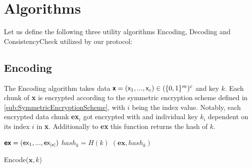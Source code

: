 \documentclass{cacthesis}
\newcounter{protocol}
\begin{document}
        \section{Algorithms}
        \label{sec:ourAlgos}
        Let us define the following three utility algorithms \textsf{Encoding}, \textsf{Decoding} and \textsf{ConsistencyCheck} utilized by our protocol:
        \subsection{Encoding}
        The \textsf{Encoding} algorithm takes data $\textsf{\textbf{x}} = (\textsf{x}_1, ..., \textsf{x}_c) \in (\{0,1\}^m)^c$ and key $k$. Each chunk of \textsf{\textbf{x}} is encrypted according to the symmetric encryption scheme defined in \ref{sub:SymmetricEncryptionScheme}, with $i$ being the index value. Notably, each encrypted data chunk \textsf{\textbf{ex}}$_i$ got encrypted with and individual key $k_i$ dependent on its index $i$ in \textsf{\textbf{x}}. Additionally to \textsf{\textbf{ex}} this function returns the hash of $k$.
        \begin{center}
        \begin{minipage}[t]{4in}
            \begin{algorithm}[H]
                $\textsf{\textbf{ex}} = (\textsf{ex}_1,..., \textsf{ex}_{|\textsf{x}|})$\;
                $hash_k = H(k)$\;
                \Return $(\textbf{ex}, hash_k)$\;
                \caption{\textsf{Encode($\textbf{x}, k$)}}
            \end{algorithm}
        \end{minipage}    
        \end{center}
        
\end{document}
